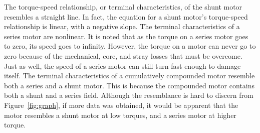 \documentclass{article}
\begin{document}
The torque-speed relationship, or terminal characteristics, of the shunt motor
resembles a straight line. In fact, the equation for a shunt motor’s
torque-speed relationship is linear, with a negative slope. The terminal
characteristics of a series motor are nonlinear. It is noted that as the torque
on a series motor goes to zero, its speed goes to infinity.  However, the
torque on a motor can never go to zero because of the mechanical, core, and
stray losses that must be overcome. Just as well, the speed of a series motor
can still turn fast enough to damage itself. The terminal characteristics of a
cumulatively compounded motor resemble both a series and a shunt motor. This is
because the compounded motor contains both a shunt and a series field. Although
the resemblance is hard to discern from Figure~\ref{fig:graph}, if more data
was obtained, it would be apparent that the motor resembles a shunt motor at
low torques, and a series motor at higher torque.
\end{document}
